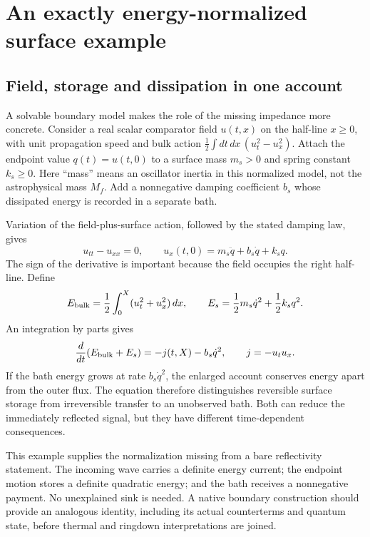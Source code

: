 \section{An exactly energy-normalized surface example}
\subsection{Field, storage and dissipation in one account}
A solvable boundary model makes the role of the missing impedance more concrete. Consider a real scalar comparator field $u(t,x)$ on the half-line $x\geq0$, with unit propagation speed and bulk action $\tfrac12\int dt\,dx\,(u_t^2-u_x^2)$. Attach the endpoint value $q(t)=u(t,0)$ to a surface mass $m_s>0$ and spring constant $k_s\geq0$. Here ``mass'' means an oscillator inertia in this normalized model, not the astrophysical mass $M_f$. Add a nonnegative damping coefficient $b_s$ whose dissipated energy is recorded in a separate bath.

Variation of the field-plus-surface action, followed by the stated damping law, gives
\begin{equation}
 u_{tt}-u_{xx}=0,\qquad
 u_x(t,0)=m_s\ddot q+b_s\dot q+k_sq.
 \label{c11:oscillatorboundary}
\end{equation}
The sign of the derivative is important because the field occupies the right half-line. Define
\begin{equation}
 E_{\rm bulk}=\frac12\int_0^X(u_t^2+u_x^2)\,dx,
 \qquad E_s=\frac12m_s\dot q^2+\frac12k_sq^2.
 \label{c11:oscillatorenergy}
\end{equation}
An integration by parts gives
\begin{equation}
 \frac{d}{dt}(E_{\rm bulk}+E_s)
 =-j(t,X)-b_s\dot q^2,
 \qquad j=-u_tu_x.
 \label{c11:oscillatorbalance}
\end{equation}
If the bath energy grows at rate $b_s\dot q^2$, the enlarged account conserves energy apart from the outer flux. The equation therefore distinguishes reversible surface storage from irreversible transfer to an unobserved bath. Both can reduce the immediately reflected signal, but they have different time-dependent consequences.

This example supplies the normalization missing from a bare reflectivity statement. The incoming wave carries a definite energy current; the endpoint motion stores a definite quadratic energy; and the bath receives a nonnegative payment. No unexplained sink is needed. A native boundary construction should provide an analogous identity, including its actual counterterms and quantum state, before thermal and ringdown interpretations are joined.

